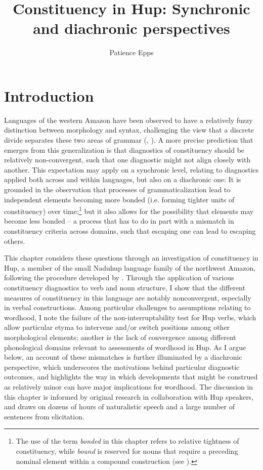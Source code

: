 \documentclass[output=paper]{langscibook}
\author{Patience Epps\orcid{}\affiliation{The University of Texas at Austin}}
\title{Constituency in Hup: Synchronic and diachronic perspectives}
\begin{document}
\maketitle 

\section{Introduction}

Languages of the western Amazon have been observed to have a relatively fuzzy distinction between morphology and syntax, challenging the view that a discrete divide separates these two areas of grammar (\citealt{Payne1990}, \citealt{Tallman2020}). A more precise prediction that emerges from this generalization is that diagnostics of constituency should be relatively non-convergent, such that one diagnostic might not align closely with another. This expectation may apply on a synchronic level, relating to diagnostics applied both across and within languages, but also on a diachronic one: It is grounded in the observation that processes of grammaticalization lead to independent elements becoming more bonded (i.e. forming tighter units of constituency) over time;\footnote{The use of the term \textit{bonded} in this chapter refers to relative tightness of constituency, while \textit{bound} is reserved for nouns that require a preceding nominal element within a compound construction (see ).} but it also allows for the possibility that elements may become less bonded – a process that has to do in part with a mismatch in constituency criteria across domains, such that escaping one can lead to escaping others.

This chapter considers these questions through an investigation of constituency in Hup, a member of the small Naduhup language family of the northwest Amazon, following the procedure developed by \citet{Tallman2021}. Through the application of various constituency diagnostics to verb and noun structure, I show that the different measures of constituency in this language are notably nonconvergent, especially in verbal constructions. Among particular challenges to assumptions relating to wordhood, I note the failure of the non-interruptability test for Hup verbs, which allow particular etyma to intervene and/or switch positions among other morphological elements; another is the lack of convergence among different phonological domains relevant to assessments of wordhood in Hup. As I argue below, an account of these mismatches is further illuminated by a diachronic perspective, which underscores the motivations behind particular diagnostic outcomes, and highlights the way in which developments that might be construed as relatively minor can have major implications for wordhood. The discussion in this chapter is informed by original research in collaboration with Hup speakers, and draws on dozens of hours of naturalistic speech and a large number of sentences from elicitation.
\end{document}
